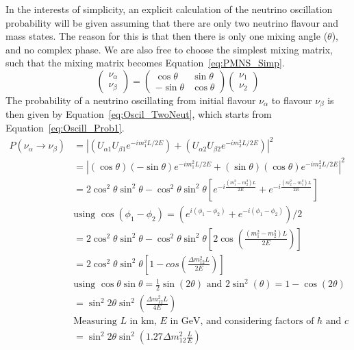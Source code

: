 In the interests of simplicity, an explicit calculation of the neutrino oscillation probability will be given assuming that there are only two neutrino flavour and mass states. The reason for this is that then there is only one mixing angle ($\theta$), and no complex phase. We are also free to choose the simplest mixing matrix, such that the mixing matrix becomes Equation~\ref{eq:PMNS_Simp}.
\begin{equation}
  \label{eq:PMNS_Simp}
  \begin{pmatrix} \nu_{\alpha} \\ \nu_{\beta} \end{pmatrix} = \begin{pmatrix} \cos\theta & \sin\theta \\ -\sin\theta & \cos\theta \end{pmatrix} \begin{pmatrix} \nu_1 \\ \nu_2 \end{pmatrix}
\end{equation}
The probability of a neutrino oscillating from initial flavour $\nu_{\alpha}$ to flavour $\nu_{\beta}$ is then given by Equation~\ref{eq:Oscil_TwoNeut}, which starts from Equation~\ref{eq:Oscill_Prob1}.
\begin{align}
  P(\nu_{\alpha}\rightarrow\nu_{\beta}) &= \left|(U_{\alpha 1}U_{\beta 1}e^{-im_{1}^{2}L/2E}) + (U_{\alpha 2}U_{\beta 2}e^{-im_{2}^{2}L/2E})\right|^2 \nonumber \\
  &= \left|(\cos\theta)(-\sin\theta)e^{-im_{1}^{2}L/2E} + (\sin\theta)(\cos\theta)e^{-im_{2}^{2}L/2E}\right|^2 \nonumber \\
  &= 2\cos^{2}\theta\sin^{2}\theta - \cos^{2}\theta\sin^{2}\theta\left[ e^{-i\frac{(m^{2}_{1}-m^{2}_{2})L}{2E}} + e^{-i\frac{(m^{2}_{2}-m^{2}_{1})L}{2E}} \right] \nonumber\\ 
  &\text{using $\cos\left(\phi_1 - \phi_2\right) = \left(e^{i(\phi_1-\phi_2)} + e^{-i(\phi_1-\phi_2)}\right)/2$} \nonumber \\
  &= 2\cos^{2}\theta\sin^{2}\theta - \cos^{2}\theta\sin^{2}\theta\left[ 2\cos\left(\frac{(m^{2}_{1}-m^{2}_{2})L}{2E} \right) \right] \nonumber \\
  &= 2\cos^{2}\theta\sin^{2}\theta \left[1 - cos\left(\frac{\Delta m^{2}_{12}L}{2E}\right) \right] \nonumber \\
  &\text{using $\cos\theta\sin\theta = \frac{1}{2}\sin(2\theta)$ and $2\sin^{2}(\theta) = 1 - \cos(2\theta)$} \nonumber \\
  &= \sin^{2}2\theta \sin^{2}\left(\frac{\Delta m^{2}_{12}L}{4E}\right) \label{eq:Oscil_TwoNeut} \\
  &\text{Measuring $L$ in km, $E$ in GeV, and considering factors of $\hbar$ and $c$} \nonumber \\
  &= \sin^{2}2\theta \sin^{2}\left(1.27\Delta m^{2}_{12}\frac{L}{E}\right) \label{eq:Oscil_Normalised}
\end{align}
